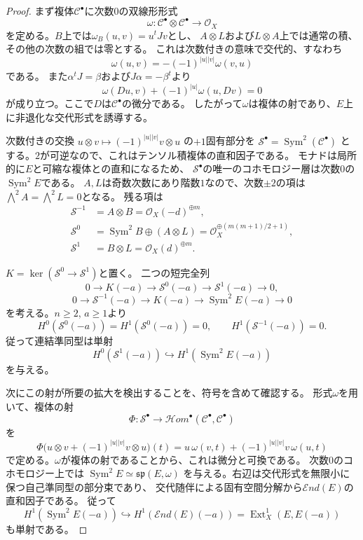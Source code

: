 \documentclass[a4paper,11pt]{ltjsarticle}
\numberwithin{equation}{section}
\theoremstyle{plain}
\theoremstyle{definition}
\theoremstyle{remark}
\begin{document}
\begin{proof}
まず複体$\mathcal C^\bullet$に次数$0$の双線形形式
\[
 \omega:\mathcal C^\bullet\otimes\mathcal C^\bullet
 \longrightarrow\mathcal O_X
\]
を定める。$B$上では$\omega_B(u,v)=u^tJv$とし、
$A\otimes L$および$L\otimes A$上では通常の積、
その他の次数の組では零とする。
これは次数付きの意味で交代的、すなわち
\[
 \omega(u,v)=-(-1)^{|u||v|}\omega(v,u)
\]
である。
また$\alpha^tJ=\beta$および$J\alpha=-\beta^t$より
\[
 \omega(Du,v)+(-1)^{|u|}\omega(u,Dv)=0
\]
が成り立つ。ここで$D$は$\mathcal C^\bullet$の微分である。
したがって$\omega$は複体の射であり、$E$上に非退化な交代形式を誘導する。

次数付きの交換
$u\otimes v\mapsto(-1)^{|u||v|}v\otimes u$
の$+1$固有部分を
$\mathcal S^\bullet=\operatorname{Sym}^2(\mathcal C^\bullet)$
とする。$2$が可逆なので、これはテンソル積複体の直和因子である。
モナドは局所的に$E$と可縮な複体との直和になるため、
$\mathcal S^\bullet$の唯一のコホモロジー層は次数$0$の
$\operatorname{Sym}^2E$である。
$A,L$は奇数次数にあり階数$1$なので、次数$\pm2$の項は
$\bigwedge^2 A=\bigwedge^2 L=0$となる。
残る項は
\begin{align*}
 \mathcal S^{-1}&=A\otimes B
   =\mathcal O_X(-d)^{\oplus m},\\
 \mathcal S^{0}&=\operatorname{Sym}^2 B\oplus(A\otimes L)
   =\mathcal O_X^{\oplus(m(m+1)/2+1)},\\
 \mathcal S^{1}&=B\otimes L
   =\mathcal O_X(d)^{\oplus m}.
\end{align*}

$K=\ker(\mathcal S^0\to\mathcal S^1)$と置く。
二つの短完全列
\[
 0\longrightarrow K(-a)\longrightarrow\mathcal S^0(-a)
 \longrightarrow\mathcal S^1(-a)\longrightarrow0,
\]
\[
 0\longrightarrow\mathcal S^{-1}(-a)\longrightarrow K(-a)
 \longrightarrow\operatorname{Sym}^2E(-a)\longrightarrow0
\]
を考える。$n\geq2$, $a\geq1$より
\[
 H^0(\mathcal S^0(-a))=H^1(\mathcal S^0(-a))=0,
 \qquad H^1(\mathcal S^{-1}(-a))=0.
\]
従って連結準同型は単射
\begin{equation}
\label{eq:symmetric-square-edge}
 H^0(\mathcal S^1(-a))
 \hookrightarrow H^1(\operatorname{Sym}^2E(-a))
\end{equation}
を与える。

次にこの射が所要の拡大を検出することを、符号を含めて確認する。
形式$\omega$を用いて、複体の射
\[
 \Phi:\mathcal S^\bullet
 \longrightarrow\mathcal H om^\bullet(\mathcal C^\bullet,
                                      \mathcal C^\bullet)
\]
を
\[
 \Phi\bigl(u\otimes v+(-1)^{|u||v|}v\otimes u\bigr)(t)
 =u\,\omega(v,t)+(-1)^{|u||v|}v\,\omega(u,t)
\]
で定める。$\omega$が複体の射であることから、これは微分と可換である。
次数$0$のコホモロジー上では
$\operatorname{Sym}^2E\simeq\mathfrak{sp}(E,\omega)$
を与える。右辺は交代形式を無限小に保つ自己準同型の部分束であり、
交代随伴による固有空間分解から$\mathcal E nd(E)$の直和因子である。
従って
\[
 H^1(\operatorname{Sym}^2E(-a))
 \hookrightarrow H^1(\mathcal E nd(E)(-a))
 =\operatorname{Ext}^1_X(E,E(-a))
\]
も単射である。


\end{proof}
\end{document}
